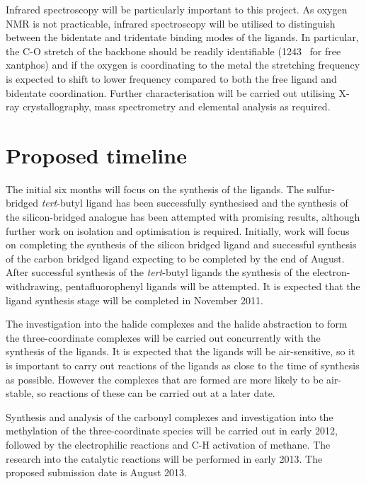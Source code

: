 Infrared spectroscopy will be particularly important to this project.  As oxygen NMR is not practicable, infrared spectroscopy will be utilised to distinguish between the bidentate and tridentate binding modes of the ligands.  In particular, the C-O stretch of the backbone should be readily identifiable (1243 \percm~for free xantphos\cite{Kranenburg1995}) and if the oxygen is coordinating to the metal the stretching frequency is expected to shift to lower frequency compared to both the free ligand and bidentate coordination.  Further characterisation will be carried out utilising X-ray crystallography, mass spectrometry and elemental analysis as required.  

\section{Proposed timeline}


The initial six months will focus on the synthesis of the ligands.  The sulfur-bridged \emph{tert}-butyl ligand has been successfully synthesised and the synthesis of the silicon-bridged analogue has been attempted with promising results, although further work on isolation and optimisation is required.  Initially, work will focus on completing the synthesis of the silicon bridged ligand and successful synthesis of the carbon bridged ligand expecting to be completed by the end of August.  After successful synthesis of the \emph{tert}-butyl ligands the synthesis of the electron-withdrawing, pentafluorophenyl ligands will be attempted.  It is expected that the ligand synthesis stage will be completed in November 2011.

The investigation into the halide complexes and the halide abstraction to form the three-coordinate complexes will be carried out concurrently with the synthesis of the ligands.  It is expected that the  ligands will be air-sensitive, so it is important to carry out reactions of the ligands as close to the time of synthesis as possible.  However the complexes that are formed are more likely to be air-stable, so reactions of these can be carried out at a later date.

Synthesis and analysis of the carbonyl complexes and investigation into the methylation of the three-coordinate species will be carried out in early 2012, followed by the electrophilic reactions and C-H activation of methane.  The research into the catalytic reactions will be performed in early 2013.  The proposed submission date is August 2013. 

